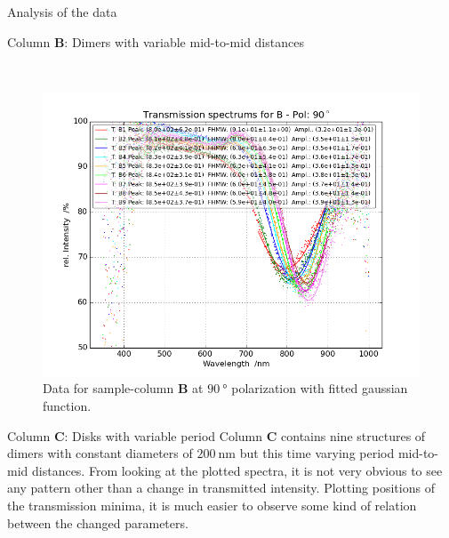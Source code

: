 \documentclass[pdftex, a4paper,11pt, twoside, UKenglish]{report}
\begin{document}
\begin{chapter}{Analysis of the data}
\begin{section}{Column \textbf{B}: Dimers with variable mid-to-mid
        distances}
\begin{figure}[ht!]
\begin{minipage}{.95\textwidth}
          \label{fig:TransspecFIT_BPol0}
        \end{minipage}\\
        \begin{minipage}{.95\textwidth}
          \centering
          \includegraphics[width=\textwidth]
              {Figures/TransspecFIT_BPol90.png}
          \caption{Data for sample-column \textbf{B} at $\SI{90}{\degree}$
              polarization with fitted gaussian function.}
          \label{fig:TransspecFIT_BPol90}
        \end{minipage}
      \end{figure}
      
    \end{section}
    
    
    
    \newpage
    \begin{section}{Column \textbf{C}: Disks with variable period}
      \label{chp:DataC}
      Column \textbf{C} contains nine structures of dimers with constant
      diameters of $\SI{200}{\nano\meter}$ but this time varying period
      mid-to-mid distances.
      From looking at the plotted spectra, it is not very obvious to see any
      pattern other than a change in transmitted intensity.
      Plotting positions of the transmission minima, it is much easier to
      observe some kind of relation between the changed parameters.


\end{section}
\end{chapter}
\end{document}
